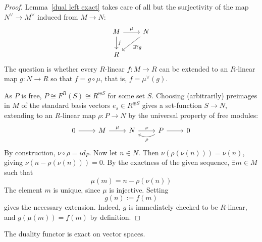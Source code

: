 \begin{proof}
Lemma~\ref{dual left exact} takes care of all but the surjectivity of the map $N^{\vee}\to M^{\vee}$ induced from $M\to N$:
\[\begin{tikzcd}
M\ar[d,"f"]\ar[r,"\mu"]&N\ar[ld,"\exists?g"]\\
R
\end{tikzcd}\]
The question is whether every $R$-linear $f:M\to R$ can be extended to an $R$-linear map $g:N\to R$ so that $f=g\circ\mu$, that is, $f=\mu^\vee(g)$.\par
As $P$ is free, $P\cong F^R(S)\cong R^{\oplus S}$ for some set $S$. Choosing (arbitrarily) preimages in $M$ of the standard basis vectors $e_s\in R^{\oplus S}$ gives a set-function $S\to N$, extending to an $R$-linear map $\rho:P\to N$ by the universal property of free modules:
\[\begin{tikzcd}
0\ar[r]&M\ar[r,"\mu"]&N\ar[r,"\nu"]&P\ar[l,bend left,"\rho"]\ar[r]&0
\end{tikzcd}\]
By construction, $\nu\circ\rho=id_P$. Now let $n\in N$. Then $\nu(\rho(\nu(n)))=\nu(n)$, giving
$\nu(n-\rho(\nu(n)))=0$. By the exactness of the given sequence, $\exists m\in M$ such that
\[\mu(m)=n-\rho(\nu(n))\]
The element $m$ is unique, since $\mu$ is injective. Setting
\[g(n):=f(m)\]
gives the necessary extension. Indeed, $g$ is immediately checked to be $R$-linear, and $g(\mu(m))=f(m)$ by definition.
\end{proof}
\begin{corollary}
The duality functor is exact on vector spaces.
\end{corollary}
